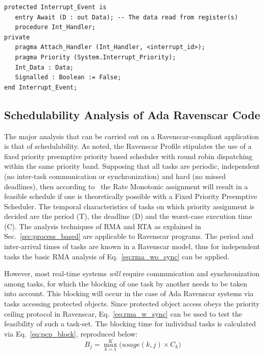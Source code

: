 \begin{minipage}{\listingwidth}
\lstset{language=ada,
  numbers=left,
  numberstyle=\tiny
}
\lstset{numbers=none}
\begin{center}
\begin{lstlisting}[label=lst:interrupt_po, caption=A protected object
    attached to an interrupt]
protected Interrupt_Event is
   entry Await (D : out Data); -- The data read from register(s)
   procedure Int_Handler;
private
   pragma Attach_Handler (Int_Handler, <interrupt_id>);
   pragma Priority (System.Interrupt_Priority);
   Int_Data : Data;
   Signalled : Boolean := False;
end Interrupt_Event;
\end{lstlisting}
\end{center}
\end{minipage}

\subsection{Schedulability Analysis of Ada Ravenscar Code}
The major analysis that can be carried out on a Ravenscar-compliant
application is that of schedulability. As noted, the Ravenscar Profile
stipulates the use of a fixed priority preemptive priority based
scheduler with round robin dispatching within the same priority
band. Supposing that all tasks are periodic, independent (no
inter-task communication or synchronization) and hard (no missed
deadlines), then according to~\cite{liu@jacm73} the Rate Monotonic
assignment will result in a feasible schedule if one is theoretically
possible with a Fixed Priority Preemptive Scheduler. The temporal
characteristics of tasks on which priority assignment is decided are
the period (T), the deadline (D) and the worst-case execution time
(C). The analysis techniques of RMA and RTA as explained in
Sec.~\ref{sec:process_based} are applicable to Ravenscar programs. The
period and inter-arrival times of tasks are known in a Ravenscar
model, thus for independent tasks the basic RMA analysis of
Eq.~\ref{eq:rma_wo_sync} can be applied.

However, most real-time systems \emph{will} require communication and
synchronization among tasks, for which the blocking of one task by
another needs to be taken into account. This blocking will occur in
the case of Ada Ravenscar systems via tasks accessing protected
objects. Since protected object access obeys the priority ceiling
protocol in Ravenscar, Eq.~\ref{eq:rma_w_sync} can be used to test the
feasibility of such a task-set. The blocking time for individual tasks
is calculated via Eq.~\ref{eq:pcp_block}, reproduced below:
\begin{displaymath}
B_j = \max_{k=1}^{K} \Big(usage(k,j)\times C_k\Big)
\end{displaymath}

